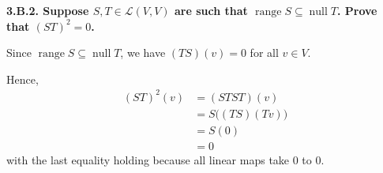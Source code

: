 \documentclass[a5paper]{article}
\begin{document}
\newcommand    \C  { \mathbf{C} }
\newcommand    \R  { \mathbf{R} }
\renewcommand  \L  { \mathcal{L} }
\newcommand    \F  { \mathbf{F} }
\renewcommand \P           {\mathcal{P}}
\newcommand   \question[1] {\textbf{\boldmath#1\unboldmath}\par}
\newcommand   \op          {\operatorname}

\question{
    3.B.2.
    Suppose $S, T \in \L(V,V)$ are such that $\op{range}S \subseteq \op{null}T$.
    Prove that $(ST)^2 = 0$.
}

    Since $\op{range}S \subseteq \op{null}T$, we have $(TS)(v) = 0$ for all $v \in V$.

    Hence,
\begin{align*}
    (ST)^2(v) &= (STST)(v)                      \\
              &= S \big( (TS)(Tv) \big)         \\
              &= S (0)                          \\
              &= 0
\end{align*}
    with the last equality holding because all linear maps take 0 to 0.
\end{document}
